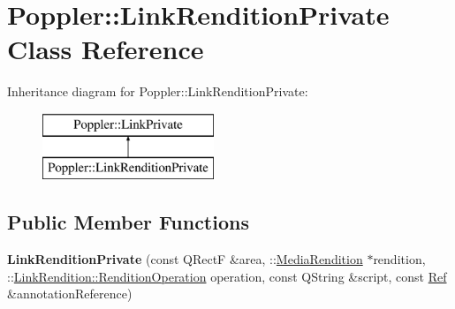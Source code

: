 \hypertarget{class_poppler_1_1_link_rendition_private}{}\section{Poppler\+:\+:Link\+Rendition\+Private Class Reference}
\label{class_poppler_1_1_link_rendition_private}
Inheritance diagram for Poppler\+:\+:Link\+Rendition\+Private\+:\begin{figure}[H]
\begin{center}
\leavevmode
\includegraphics[height=2.000000cm]{class_poppler_1_1_link_rendition_private}
\end{center}
\end{figure}
\subsection*{Public Member Functions}
\begin{DoxyCompactItemize}
\item 
\mbox{\label{class_poppler_1_1_link_rendition_private_aef66f4bdc4cb3611745ffabb9005994a}} 
{\bfseries Link\+Rendition\+Private} (const Q\+RectF \&area, \+::\hyperlink{class_poppler_1_1_media_rendition}{Media\+Rendition} $\ast$rendition, \+::\hyperlink{class_link_rendition_ab30486eefee99cd4ee5c9d95ad591f5e}{Link\+Rendition\+::\+Rendition\+Operation} operation, const Q\+String \&script, const \hyperlink{struct_ref}{Ref} \&annotation\+Reference)
\end{DoxyCompactItemize}

